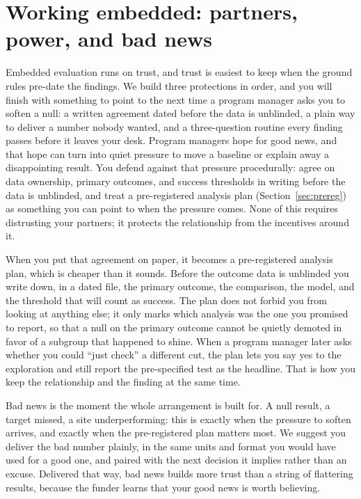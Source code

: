 \documentclass[
    a4paper,
    fontsize=10pt,
    twoside=true,
    numbers=noenddot,
]{kaobook}
\begin{document}
\section{Working embedded: partners, power, and bad news}\label{sec:literacy}
Embedded evaluation runs on trust, and trust is easiest to keep when the ground rules pre-date the findings. We build three protections in order, and you will finish with something to point to the next time a program manager asks you to soften a null: a written agreement dated before the data is unblinded, a plain way to deliver a number nobody wanted, and a three-question routine every finding passes before it leaves your desk. Program managers hope for good news, and that hope can turn into quiet pressure to move a baseline or explain away a disappointing result. You defend against that pressure procedurally: agree on data ownership, primary outcomes, and success thresholds in writing before the data is unblinded, and treat a pre-registered analysis plan (Section~\ref{sec:prereg}) as something you can point to when the pressure comes. None of this requires distrusting your partners; it protects the relationship from the incentives around it.

When you put that agreement on paper, it becomes a pre-registered analysis plan, which is cheaper than it sounds. Before the outcome data is unblinded you write down, in a dated file, the primary outcome, the comparison, the model, and the threshold that will count as success. The plan does not forbid you from looking at anything else; it only marks which analysis was the one you promised to report, so that a null on the primary outcome cannot be quietly demoted in favor of a subgroup that happened to shine. When a program manager later asks whether you could \enquote{just check} a different cut, the plan lets you say yes to the exploration and still report the pre-specified test as the headline. That is how you keep the relationship and the finding at the same time.

Bad news is the moment the whole arrangement is built for. A null result, a target missed, a site underperforming: this is exactly when the pressure to soften arrives, and exactly when the pre-registered plan matters most. We suggest you deliver the bad number plainly, in the same units and format you would have used for a good one, and paired with the next decision it implies rather than an excuse. Delivered that way, bad news builds more trust than a string of flattering results, because the funder learns that your good news is worth believing.
\end{document}
